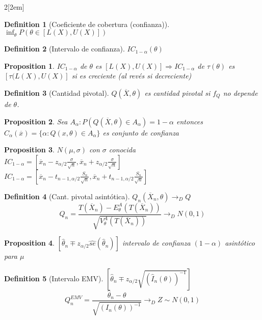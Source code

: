 \documentclass[leqno]{article}
\newtheorem*{proposition}{Proposition}
\newtheorem*{definition}{Definition}
\begin{document}
\begin{multicols}{2}[\columnsep2em]
\begin{definition}[Coeficiente de cobertura (confianza)] 
$\inf_{\theta }P(\theta \in [L(X), U(X)])$
\end{definition}

\begin{definition}[Intervalo de confianza] $IC_{1-\alpha }(\theta)$
\end{definition}

\begin{proposition} 
  $IC_{1-\alpha }$ de $\theta$ es $[L(X), U(X)] \Rightarrow IC_{1-\alpha}$ de $\tau (\theta )$ es $[\tau (L(X), U(X)]$ si es creciente (al revés si decreciente)
\end{proposition}

\begin{definition}[Cantidad pivotal] $Q(\overline{X}, \theta )$ es cantidad pivotal si $f_Q$ no depende de  $\theta $.
\end{definition}

\begin{proposition}
  Sea $A_\alpha : P(Q(\overline{X}, \theta )\in A_\alpha) = 1-\alpha$ entonces $C_\alpha (\overline{x}) = \{\alpha : Q(x,\theta )\in A_\alpha \}$ es conjunto de confianza
\end{proposition}

\begin{proposition}$N(\mu, \sigma )$ con $\sigma $ conocida\\
  $IC_{1-\alpha } = [\overline{x}_n - z_{\alpha /2} \frac{\sigma }{\sqrt{n} }, \overline{x}_n + z_{\alpha /2} \frac{\sigma }{\sqrt{n} }]$ \\
  $IC_{1-\alpha } = [\overline{x}_n - t_{n-1,\alpha /2} \frac{S_n }{\sqrt{n} }, \overline{x}_n + t_{n-1,\alpha /2} \frac{S_n }{\sqrt{n} }]$
\end{proposition}

\begin{definition}[Cant. pivotal asintótica] $Q_n(\overline{X}_n, \theta ) \to_D Q$ 
  \[
  Q_n = \frac{T(\overline{X}_n) - E_{\theta }^A (T(\overline{X}_n))}{\sqrt{V_\theta ^A(T(\overline{X}_n))} } \to _D N(0,1)
  \] 
\end{definition}

\begin{proposition}$[\hat{\theta }_n \mp z_{\alpha /2}\hat{se}(\hat{\theta }_n)]$ intervalo de confianza $(1-\alpha )$ asintótico para $\mu$
\end{proposition}

\begin{definition}[Intervalo EMV] $\left[\hat{\theta }_n \mp z_{\alpha /2} \sqrt{(\hat{I}_n(\theta ))^{-1}} \right]$
  \[
	Q_n^{EMV} = \frac{\hat{\theta }_n-\theta }{\sqrt{(I_n(\theta ))^{-1}} } \to _D Z \sim N(0,1)
  \] 
\end{definition}


\end{multicols}
\end{document}
